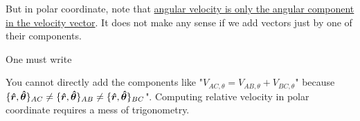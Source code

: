 \documentclass[class=article, crop=false, 12pt]{standalone}
\begin{document}

But in polar coordinate, note that \ul{angular velocity is only the angular component in the velocity vector}.
It does not make any sense if we add vectors just by one of their components.



One must write 

You cannot directly add the components like 
"$V_{AC,\theta}=V_{AB,\theta}+V_{BC,\theta}$" because 
$\{\vu*{r},\vu*{\theta}\}_{AC} \neq \{\vu*{r},\vu*{\theta}\}_{AB} \neq \{\vu*{r},\vu*{\theta}\}_{BC}$".
Computing relative velocity in polar coordinate requires a mess of trigonometry.


\end{document}
